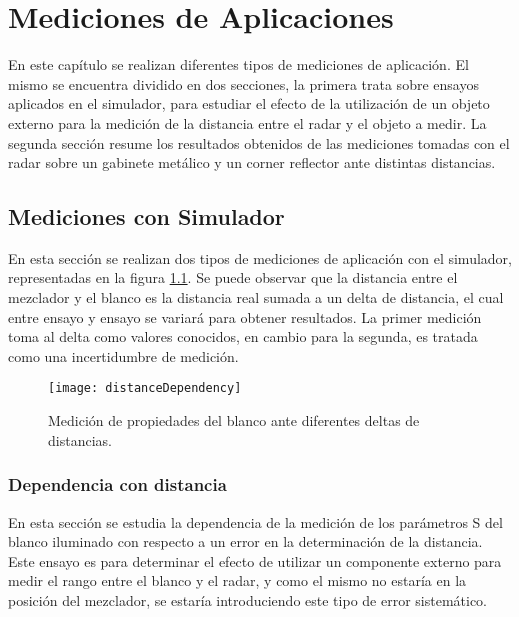 \chapter{Mediciones de Aplicaciones} \label{ch:measurements}

\ifpdf
    \graphicspath{{Chapter5/Figs/Raster/}{Chapter5/Figs/PDF/}{Chapter5/Figs/}}
\else
    \graphicspath{{Chapter5/Figs/Vector/}{Chapter5/Figs/}}
\fi

En este capítulo se realizan diferentes tipos de mediciones de aplicación. El mismo se encuentra dividido en dos secciones, la primera trata sobre ensayos aplicados en el simulador, para estudiar el efecto de la utilización de un objeto externo para la medición de la distancia entre el radar y el objeto a medir. La segunda sección resume los resultados obtenidos de las mediciones tomadas con el radar sobre un gabinete metálico y un corner reflector ante distintas distancias.


\section{Mediciones con Simulador}

En esta sección se realizan dos tipos de mediciones de aplicación con el simulador, representadas en la figura \ref{fig:DistDependencySim}. Se puede observar que la distancia entre el mezclador y el blanco es la distancia real sumada a un delta de distancia, el cual entre ensayo y ensayo se variará para obtener resultados. La primer medición toma al delta como valores conocidos, en cambio para la segunda, es tratada como una incertidumbre de medición.
\begin{figure}
  \centering
  \texttt{[image: distanceDependency]}
  \caption{Medición de propiedades del blanco ante diferentes deltas de distancias.}
  \label{fig:DistDependencySim}
\end{figure}


\subsection{Dependencia con distancia}

En esta sección se estudia la dependencia de la medición de los parámetros S del blanco iluminado con respecto a un error en la determinación de la distancia. Este ensayo es para determinar el efecto de utilizar un componente externo para medir el rango entre el blanco y el radar, y como el mismo no estaría en la posición del mezclador, se estaría introduciendo este tipo de error sistemático. 

